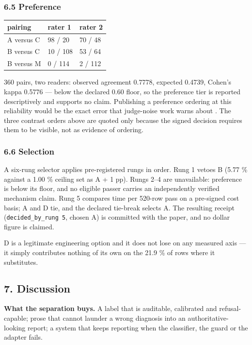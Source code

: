 \documentclass[
  10pt,
]{article}
\begin{document}
\subsubsection{6.5 Preference}\label{preference}

\begin{longtable}[]{@{}lll@{}}
\toprule\noalign{}
pairing & rater 1 & rater 2 \\
\midrule\noalign{}
\endhead
\bottomrule\noalign{}
\endlastfoot
A versus C & 98 / 20 & 70 / 48 \\
B versus C & 10 / 108 & 53 / 64 \\
B versus M & 0 / 114 & 2 / 112 \\
\end{longtable}

360 pairs, two readers: observed agreement 0.7778, expected 0.4739,
Cohen's kappa 0.5776 --- below the declared 0.60 floor, so the
preference tier is reported descriptively and supports no claim.
Publishing a preference ordering at this reliability would be the exact
error that judge-noise work warns about \citep{zheng2023judging}. The
three contrast orders above are quoted only because the signed decision
requires them to be visible, not as evidence of ordering.

\subsubsection{6.6 Selection}\label{selection}

A six-rung selector applies pre-registered rungs in order. Rung 1 vetoes
B (5.77 \% against a 1.00 \% ceiling set as A + 1 pp). Rungs 2--4 are
unavailable: preference is below its floor, and no eligible passer
carries an independently verified mechanism claim. Rung 5 compares time
per 520-row pass on a pre-signed cost basis; A and D tie, and the
declared tie-break selects A. The resulting receipt
(\texttt{decided\_by\_rung\ 5}, chosen A) is committed with the paper,
and no dollar figure is claimed.

D is a legitimate engineering option and it does not lose on any
measured axis --- it simply contributes nothing of its own on the 21.9
\% of rows where it substitutes.

\subsection{7. Discussion}\label{discussion}

\textbf{What the separation buys.} A label that is auditable, calibrated
and refusal-capable; prose that cannot launder a wrong diagnosis into an
authoritative-looking report; a system that keeps reporting when the
classifier, the guard or the adapter fails.
\end{document}
